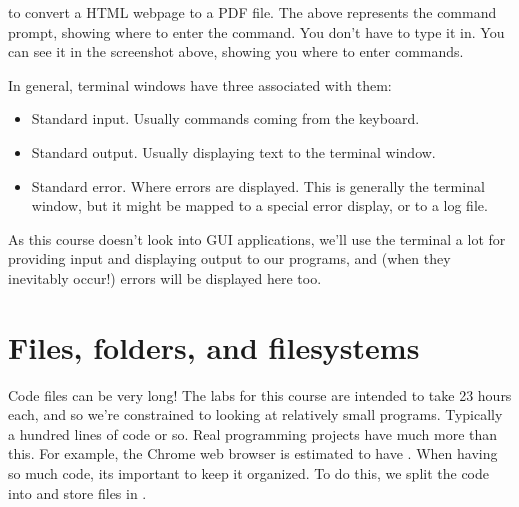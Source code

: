 \documentclass[letterpaper,10pt,british]{sphinxmanual}
\begin{document}
\begin{sphinxVerbatim}[commandchars=\\\{\}]
\end{sphinxVerbatim}

\sphinxAtStartPar
to convert a HTML webpage to a PDF file. The \sphinxstylestrong{\textgreater{}} above represents the command prompt, showing where to enter the command. You don’t have to type it in. You can see it in the screenshot above, showing you where to enter commands.

\sphinxAtStartPar
In general, terminal windows have three  associated with them:
\begin{itemize}
\item {} 
\sphinxAtStartPar
Standard input. Usually commands coming from the keyboard.

\item {} 
\sphinxAtStartPar
Standard output. Usually displaying text to the terminal window.

\item {} 
\sphinxAtStartPar
Standard error. Where errors are displayed. This is generally the terminal window, but it might be mapped to a special error display, or to a log file.

\end{itemize}

\sphinxAtStartPar
As this course doesn’t look into GUI applications, we’ll use the terminal a lot for providing input and displaying output to our programs, and (when they inevitably occur!) errors will be displayed here too.

\sphinxstepscope


\section{Files, folders, and filesystems}
\label{\detokenize{chapters/computer_software/files_and_folders:files-folders-and-filesystems}}\label{\detokenize{chapters/computer_software/files_and_folders:files-folders-filesystems}}\label{\detokenize{chapters/computer_software/files_and_folders::doc}}
\sphinxAtStartPar
Code files can be very long! The labs for this course are intended to take 2\sphinxhyphen{}3 hours each, and so we’re constrained to looking at relatively small programs. Typically a hundred lines of code or so. Real programming projects have much more than this. For example, the Chrome web browser is estimated to have . When having so much code, its important to keep it organized. To do this, we split the code into  and store files in .
\end{document}
